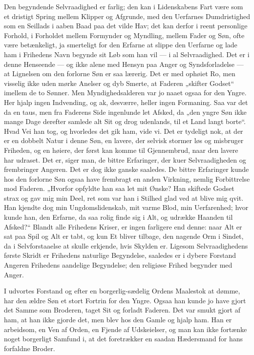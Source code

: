 \documentclass[12pt]{book}
\begin{document}
Den begyndende Selvraadighed er farlig; den kan i Lidenskabens Fart
være som et dristigt Spring mellem Klipper og Afgrunde, med den
Uerfarnes Dumdristighed som en Seillads i aaben Baad paa det vilde
Hav; det kan derfor i reent personlige Forhold, i Forholdet mellem
Formynder og Myndling, mellem Fader og Søn, ofte være betænkeligt,
ja smerteligt for den Erfarne at slippe den Uerfarne og lade ham i
Frihedens Navn begynde sit Løb som han vil --- i al Selvraadighed.
Det er i denne Henseende --- og ikke alene med Hensyn paa Anger og
Syndsforladelse --- at Lignelsen om den forlorne Søn er saa lærerig.
Det er med ophøiet Ro, men visselig ikke uden mørke Anelser og dyb
Smerte, at Faderen „skifter Godset“ imellem de to Sønner. Men
Myndighedsalderen var jo naaet ogsaa for den Yngre. Her hjalp ingen
Indvending, og ak, desværre, heller ingen Formaning. Saa
var det da en taus, men fra Faderens Side ingenlunde let Afsked, da
„den yngre Søn ikke mange Dage derefter samlede alt Sit og drog
udenlands, til et Land langt borte“. Hvad Vei han tog, og hvorledes
det gik ham, vide vi. Det er tydeligt nok, at der er en dobbelt
Natur i denne Søn, en lavere, der selvisk stormer løs og misbruger
Friheden, og en høiere, der først kan komme til Gjennembrud, naar
den lavere har udraset. Det er, siger man, de bittre Erfaringer, der
kuer Selvraadigheden og frembringer Angeren. Det er dog ikke ganske
saaledes. De bittre Erfaringer kunde hos den forlorne Søn ogsaa have
frembragt en anden Virkning, nemlig Forbittrelse mod Faderen.
„Hvorfor opfyldte han saa let mit Ønske? Han skiftede Godset strax
og gav mig min Deel, ret som var han i Stilhed glad ved at blive mig
qvit. Han kjendte dog min Ungdomslidenskab, mit varme Blod, min
Uerfarenhed; hvor kunde han, den Erfarne, da saa rolig finde sig i
Alt, og udrække Haanden til Afsked?“ Blandt alle Frihedens Kriser,
er ingen farligere end denne: naar Alt er sat paa Spil og Alt er
tabt, og kun Et bliver tilbage, den nagende Orm i Sindet, da i
Selvforstaaelse at skulle erkjende, hvis Skylden er. Ligesom
Selvraadighedens første Skridt er Frihedens naturlige Begyndelse,
saaledes er i dybere Forstand Angeren Frihedens aandelige
Begyndelse; den religiøse Frihed begynder med Anger.

I udvortes Forstand og efter en borgerlig-sædelig Ordens Maalestok
at dømme, har den ældre Søn et stort Fortrin for den Yngre. Ogsaa
han kunde jo have gjort det Samme som Broderen, taget Sit og forladt
Faderen. Det var smukt gjort af ham, at han ikke gjorde det, men
blev hos den Gamle og hjalp ham. Han er arbeidsom, en Ven af Orden,
en Fjende af Udskeielser, og man kan ikke fortænke noget borgerligt
Samfund i, at det foretrækker en saadan Hædersmand for hans
forfaldne Broder.
\end{document}
